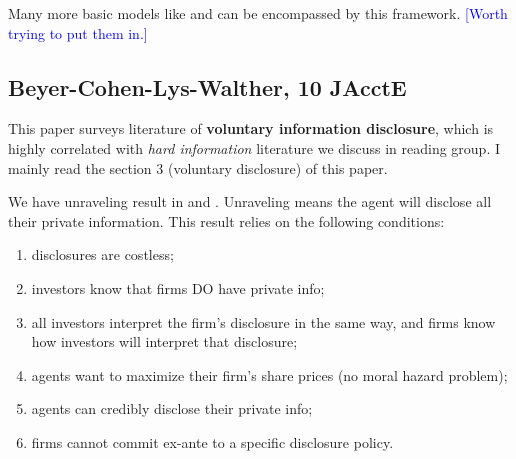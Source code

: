 \documentclass{book}
\theoremstyle{plain}
\theoremstyle{definition}
\begin{document}
Many more basic models like \cite{Dye:1985a} and \cite{Milgrom:1981dv} can be encompassed by this framework. \textcolor{blue}{[Worth trying to put them in.]}




\subsection{Beyer-Cohen-Lys-Walther, 10 JAcctE} %
\label{sub:beyer_cohen_lys_Walther_10_jaccte}

\textbf{}

This paper surveys literature of \textbf{voluntary information disclosure}, which is highly correlated with \textit{hard information} literature we discuss in reading group. I mainly read the section 3 (voluntary disclosure) of this paper.

We have unraveling result in \cite{Milgrom:1981dv} and \cite{Grossman:1981ih}. Unraveling means the agent will disclose all their private information. This result relies on the following conditions:
\begin{enumerate}
	\setlength{\itemsep}{0pt}
	\item disclosures are costless;
	\item investors know that firms DO have private info;
	\item all investors interpret the firm's disclosure in the same way, and firms know how investors will interpret that disclosure;
	\item agents want to maximize their firm's share prices (no moral hazard problem);
	\item agents can credibly disclose their private info;
	\item firms cannot commit ex-ante to a specific disclosure policy.
\end{enumerate}
\end{document}
